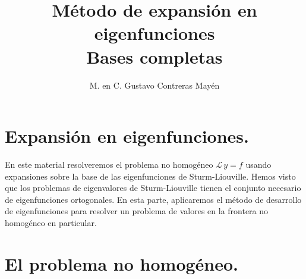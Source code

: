 
\title{Método de expansión en eigenfunciones \\ \large {Bases completas}\vspace{-3ex}}

\author{M. en C. Gustavo Contreras Mayén}
\date{ }

\pagestyle{fancy}
\fancyhf{}
\lhead{\leftmark}
\rfoot{\thepage}
\setlength{\headheight}{16pt}%


\maketitle
\fontsize{14}{14}\selectfont
\tableofcontents
\newpage

\section{Expansión en eigenfunciones.}

En este material resolveremos el problema no homogéneo $\mathcal{L} \, y = f$ usando expansiones sobre la base de las eigenfunciones de Sturm-Liouville. Hemos visto que los problemas de eigenvalores de Sturm-Liouville tienen el conjunto necesario de eigenfunciones ortogonales. En esta parte, aplicaremos el método de desarrollo de eigenfunciones para resolver un problema de valores en la frontera no homogéneo en particular.

\section{El problema no homogéneo.}

